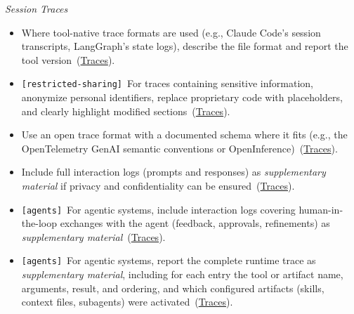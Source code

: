 \documentclass[smallextended]{svjour3}
\makeatletter
\newcommand{\must}{\textbf{must}\xspace}
\newcommand{\should}{\textbf{should}\xspace}
\newcommand{\supplementarymaterial}{\emph{supplementary material}\xspace}
\newcommand{\supplementarymaterial}{\emph{supplementary material}\xspace}
\newcommand{\iconM}{\usebox{\iconMbox}\xspace}
\newcommand{\iconS}{\usebox{\iconSbox}\xspace}
\newcommand{\iconM}{●\xspace}
\newcommand{\iconS}{○\xspace}
\newcommand{\condition}[1]{\texttt{\small[#1]}\,}
\newcommand{\condition}[1]{@@cond:#1@@}
\newcommand{\llmusage}{\hyperref[sec:studying-llm-usage-in-software-engineering]{\mbox{\emph{Studying LLM Usage}}}\xspace}
\newcommand{\llmusage}{\href{/study-types/usage/}{\emph{Studying LLM Usage}}\xspace}
\newcommand{\reftraces}{\hyperref[sec:report-session-traces]{Traces}}
\newcommand{\reftraces}{\href{/guidelines/traces/}{Traces}}
\makeatother
\begin{document}
\begin{appendices}
\noindent\textit{Session Traces}
\begin{itemize}[label={},leftmargin=*]
    \item \iconM Where tool-native trace formats are used (e.g., Claude Code's session transcripts, LangGraph's state logs), describe the file format and report the tool version~(\reftraces).
    \item \iconM \condition{restricted-sharing} For traces containing sensitive information, anonymize personal identifiers, replace proprietary code with placeholders, and clearly highlight modified sections~(\reftraces).
    \item \iconS Use an open trace format with a documented schema where it fits (e.g., the OpenTelemetry GenAI semantic conventions or OpenInference)~(\reftraces).
    \item \iconS Include full interaction logs (prompts and responses) as \supplementarymaterial if privacy and confidentiality can be ensured~(\reftraces).
    \item \iconS \condition{agents} For agentic systems, include interaction logs covering human-in-the-loop exchanges with the agent (feedback, approvals, refinements) as \supplementarymaterial~(\reftraces).
    \item \iconS \condition{agents} For agentic systems, report the complete runtime trace as \supplementarymaterial, including for each entry the tool or artifact name, arguments, result, and ordering, and which configured artifacts (skills, context files, subagents) were activated~(\reftraces).

\end{itemize}
\end{appendices}
\end{document}
